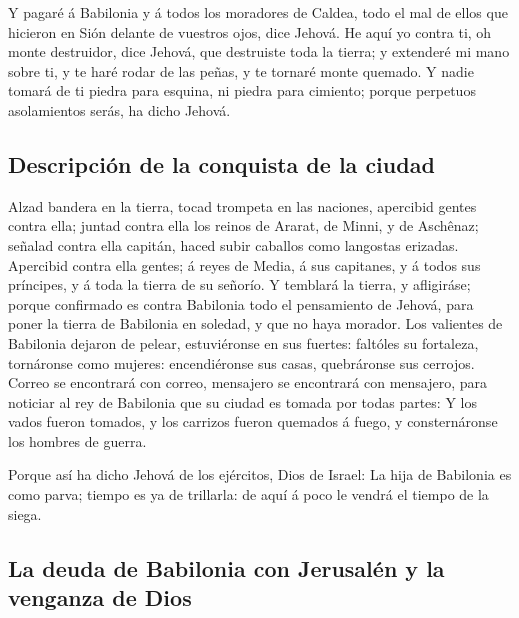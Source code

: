  Y pagaré á Babilonia y á todos los moradores de Caldea,
todo el mal de ellos que hicieron en Sión delante de vuestros ojos, dice
Jehová.  He aquí yo contra ti, oh monte destruidor, dice
Jehová, que destruiste toda la tierra; y extenderé mi mano sobre ti, y
te haré rodar de las peñas, y te tornaré monte quemado. 
Y nadie tomará de ti piedra para esquina, ni piedra para cimiento;
porque perpetuos asolamientos serás, ha dicho Jehová.

\hypertarget{descripciuxf3n-de-la-conquista-de-la-ciudad}{%
\subsection{Descripción de la conquista de la
ciudad}\label{descripciuxf3n-de-la-conquista-de-la-ciudad}}

 Alzad bandera en la tierra, tocad trompeta en las
naciones, apercibid gentes contra ella; juntad contra ella los reinos de
Ararat, de Minni, y de Aschênaz; señalad contra ella capitán, haced
subir caballos como langostas erizadas.  Apercibid contra
ella gentes; á reyes de Media, á sus capitanes, y á todos sus príncipes,
y á toda la tierra de su señorío.  Y temblará la tierra,
y afligiráse; porque confirmado es contra Babilonia todo el pensamiento
de Jehová, para poner la tierra de Babilonia en soledad, y que no haya
morador.  Los valientes de Babilonia dejaron de pelear,
estuviéronse en sus fuertes: faltóles su fortaleza, tornáronse como
mujeres: encendiéronse sus casas, quebráronse sus cerrojos.
 Correo se encontrará con correo, mensajero se encontrará
con mensajero, para noticiar al rey de Babilonia que su ciudad es tomada
por todas partes:  Y los vados fueron tomados, y los
carrizos fueron quemados á fuego, y consternáronse los hombres de
guerra.

 Porque así ha dicho Jehová de los ejércitos, Dios de
Israel: La hija de Babilonia es como parva; tiempo es ya de trillarla:
de aquí á poco le vendrá el tiempo de la siega.

\hypertarget{la-deuda-de-babilonia-con-jerusaluxe9n-y-la-venganza-de-dios}{%
\subsection{La deuda de Babilonia con Jerusalén y la venganza de
Dios}\label{la-deuda-de-babilonia-con-jerusaluxe9n-y-la-venganza-de-dios}}

